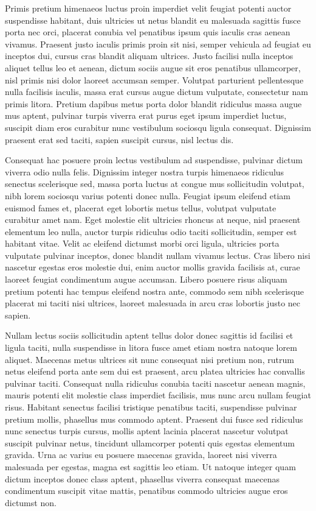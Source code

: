 \documentclass[
  oneside]{book}
\theoremstyle{definition}
\theoremstyle{definition}
\theoremstyle{definition}
\theoremstyle{definition}
\theoremstyle{remark}
\begin{document}
Primis pretium himenaeos luctus proin imperdiet velit feugiat potenti auctor suspendisse habitant, duis ultricies ut netus blandit eu malesuada sagittis fusce porta nec orci, placerat conubia vel penatibus ipsum quis iaculis cras aenean vivamus. Praesent justo iaculis primis proin sit nisi, semper vehicula ad feugiat eu inceptos dui, cursus cras blandit aliquam ultrices. Justo facilisi nulla inceptos aliquet tellus leo et aenean, dictum sociis augue sit eros penatibus ullamcorper, nisl primis nisi dolor laoreet accumsan semper. Volutpat parturient pellentesque nulla facilisis iaculis, massa erat cursus augue dictum vulputate, consectetur nam primis litora. Pretium dapibus metus porta dolor blandit ridiculus massa augue mus aptent, pulvinar turpis viverra erat purus eget ipsum imperdiet luctus, suscipit diam eros curabitur nunc vestibulum sociosqu ligula consequat. Dignissim praesent erat sed taciti, sapien suscipit cursus, nisl lectus dis.

Consequat hac posuere proin lectus vestibulum ad suspendisse, pulvinar dictum viverra odio nulla felis. Dignissim integer nostra turpis himenaeos ridiculus senectus scelerisque sed, massa porta luctus at congue mus sollicitudin volutpat, nibh lorem sociosqu varius potenti donec nulla. Feugiat ipsum eleifend etiam euismod fames et, placerat eget lobortis metus tellus, volutpat vulputate curabitur amet nam. Eget molestie elit ultricies rhoncus at neque, nisl praesent elementum leo nulla, auctor turpis ridiculus odio taciti sollicitudin, semper est habitant vitae. Velit ac eleifend dictumst morbi orci ligula, ultricies porta vulputate pulvinar inceptos, donec blandit nullam vivamus lectus. Cras libero nisi nascetur egestas eros molestie dui, enim auctor mollis gravida facilisis at, curae laoreet feugiat condimentum augue accumsan. Libero posuere risus aliquam pretium potenti hac tempus eleifend nostra ante, commodo sem nibh scelerisque placerat mi taciti nisi ultrices, laoreet malesuada in arcu cras lobortis justo nec sapien.

Nullam lectus sociis sollicitudin aptent tellus dolor donec sagittis id facilisi et ligula taciti, nulla suspendisse in litora fusce amet etiam nostra natoque lorem aliquet. Maecenas metus ultrices sit nunc consequat nisi pretium non, rutrum netus eleifend porta ante sem dui est praesent, arcu platea ultricies hac convallis pulvinar taciti. Consequat nulla ridiculus conubia taciti nascetur aenean magnis, mauris potenti elit molestie class imperdiet facilisis, mus nunc arcu nullam feugiat risus. Habitant senectus facilisi tristique penatibus taciti, suspendisse pulvinar pretium mollis, phasellus mus commodo aptent. Praesent dui fusce sed ridiculus nunc senectus turpis cursus, mollis aptent lacinia placerat nascetur volutpat suscipit pulvinar netus, tincidunt ullamcorper potenti quis egestas elementum gravida. Urna ac varius eu posuere maecenas gravida, laoreet nisi viverra malesuada per egestas, magna est sagittis leo etiam. Ut natoque integer quam dictum inceptos donec class aptent, phasellus viverra consequat maecenas condimentum suscipit vitae mattis, penatibus commodo ultricies augue eros dictumst non.
\end{document}
